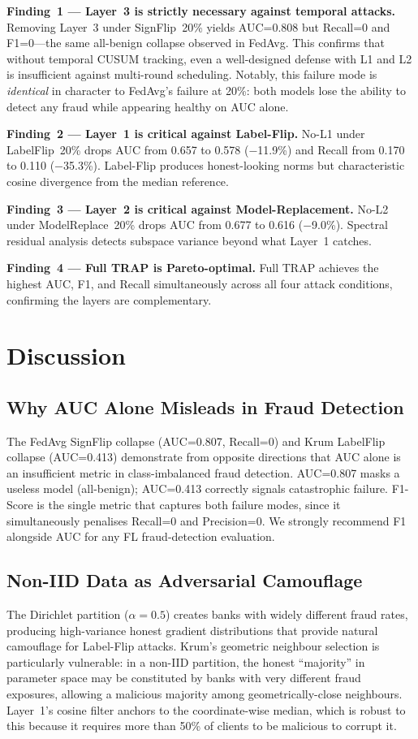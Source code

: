 \documentclass[journal]{IEEEtran}
\newcommand{\sysname}{TRAP}
\begin{document}
\textbf{Finding~1 --- Layer~3 is strictly necessary against temporal attacks.}
Removing Layer~3 under SignFlip~20\% yields AUC=0.808 but Recall=0 and
F1=0---the same all-benign collapse observed in FedAvg. This confirms that
without temporal CUSUM tracking, even a well-designed defense with L1 and L2
is insufficient against multi-round scheduling. Notably, this failure mode is
\emph{identical} in character to FedAvg's failure at 20\%: both models lose
the ability to detect any fraud while appearing healthy on AUC alone.

\textbf{Finding~2 --- Layer~1 is critical against Label-Flip.}
No-L1 under LabelFlip~20\% drops AUC from 0.657 to 0.578 ($-$11.9\%) and
Recall from 0.170 to 0.110 ($-$35.3\%). Label-Flip produces honest-looking
norms but characteristic cosine divergence from the median reference.

\textbf{Finding~3 --- Layer~2 is critical against Model-Replacement.}
No-L2 under ModelReplace~20\% drops AUC from 0.677 to 0.616 ($-$9.0\%).
Spectral residual analysis detects subspace variance beyond what Layer~1 catches.

\textbf{Finding~4 --- Full \sysname{} is Pareto-optimal.}
Full \sysname{} achieves the highest AUC, F1, and Recall simultaneously
across all four attack conditions, confirming the layers are complementary.

\section{Discussion}

\subsection{Why AUC Alone Misleads in Fraud Detection}
The FedAvg SignFlip collapse (AUC=0.807, Recall=0) and Krum LabelFlip collapse
(AUC=0.413) demonstrate from opposite directions that AUC alone is an
insufficient metric in class-imbalanced fraud detection. AUC=0.807 masks a
useless model (all-benign); AUC=0.413 correctly signals catastrophic failure.
F1-Score is the single metric that captures both failure modes, since it
simultaneously penalises Recall=0 and Precision=0. We strongly recommend
F1 alongside AUC for any FL fraud-detection evaluation.

\subsection{Non-IID Data as Adversarial Camouflage}
The Dirichlet partition ($\alpha{=}0.5$) creates banks with widely different
fraud rates, producing high-variance honest gradient distributions that provide
natural camouflage for Label-Flip attacks. Krum's geometric neighbour
selection is particularly vulnerable: in a non-IID partition, the honest
``majority'' in parameter space may be constituted by banks with very different
fraud exposures, allowing a malicious majority among geometrically-close
neighbours. Layer~1's cosine filter anchors to the coordinate-wise median,
which is robust to this because it requires more than 50\% of clients to
be malicious to corrupt it.
\end{document}
